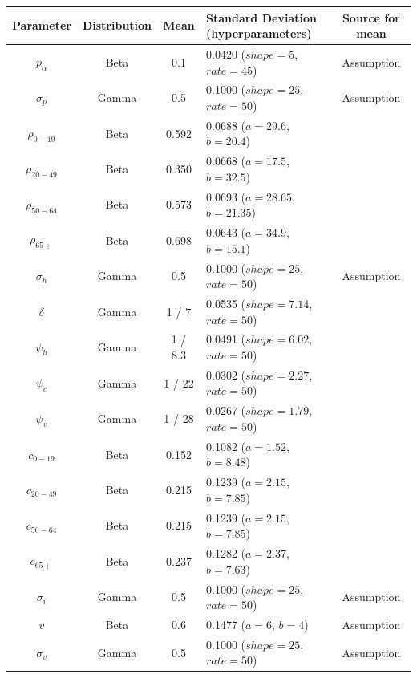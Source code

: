\documentclass{article}
\begin{document}
\begin{table}
\begin{center}
\begin{tabular}{|c|c|c|l|c|}
\hline
Parameter & Distribution & Mean & \makecell{Standard Deviation \\ (hyperparameters)} & Source for mean \\
\hline
$p_\alpha$ & Beta & 0.1 & 0.0420 ($shape = 5$, $rate = 45$) & Assumption \\
$\sigma_p$ & Gamma & 0.5 & 0.1000 ($shape = 25$, $rate = 50$) & Assumption \\
$\rho_{0-19}$ & Beta & 0.592 & 0.0688 ($a = 29.6$, $b = 20.4$) & \citet{Petrilli:2020} \\
$\rho_{20-49}$ & Beta & 0.350 & 0.0668 ($a = 17.5$, $b = 32.5$) & \citet{Petrilli:2020} \\
$\rho_{50-64}$ & Beta & 0.573 & 0.0693 ($a = 28.65$, $b = 21.35$) & \citet{Petrilli:2020} \\
$\rho_{65+}$ & Beta & 0.698 & 0.0643 ($a = 34.9$, $b = 15.1$) & \citet{Petrilli:2020} \\
$\sigma_h$ & Gamma & 0.5 & 0.1000 ($shape = 25$, $rate = 50$) & Assumption \\
$\delta$ & Gamma & 1 / 7 & 0.0535 ($shape = 7.14$, $rate = 50$) & \citet{Garg:2020} \\
$\psi_h$ & Gamma & 1 / 8.3 & 0.0491 ($shape = 6.02$, $rate = 50$) & \citet{Beigel:2020} \\
$\psi_c$ & Gamma & 1 / 22 & 0.0302 ($shape = 2.27$, $rate = 50$) & \citet{Beigel:2020} \\
$\psi_v$ & Gamma & 1 / 28 & 0.0267 ($shape = 1.79$, $rate = 50$) & \citet{Beigel:2020} \\
$c_{0-19}$ & Beta & 0.152 & 0.1082 ($a = 1.52$, $b = 8.48$) & \citet{Richardson:2020} \\
$c_{20-49}$ & Beta & 0.215 & 0.1239 ($a = 2.15$, $b = 7.85$) & \citet{Richardson:2020} \\
$c_{50-64}$ & Beta & 0.215 & 0.1239 ($a = 2.15$, $b = 7.85$) & \citet{Richardson:2020} \\
$c_{65+}$ & Beta & 0.237 & 0.1282 ($a = 2.37$, $b = 7.63$) & \citet{Richardson:2020} \\
$\sigma_i$ & Gamma & 0.5 & 0.1000 ($shape = 25$, $rate = 50$) & Assumption \\
$v$ & Beta & 0.6 & 0.1477 ($a = 6$, $b = 4$) & Assumption \\
$\sigma_v$ & Gamma & 0.5 & 0.1000 ($shape = 25$, $rate = 50$) & Assumption \\

\end{tabular}
\end{center}
\end{table}
\end{document}

